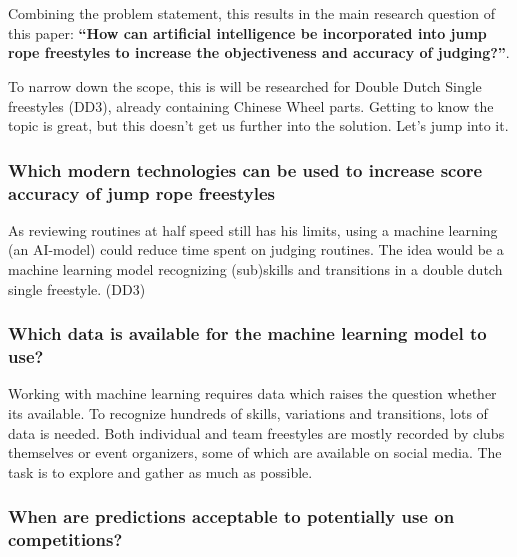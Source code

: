 \section{}%
\label{sec:onderzoeksvraag}

Combining the problem statement, this results in the main research question of this paper: \textbf{``How can artificial intelligence be incorporated into jump rope freestyles to increase the objectiveness and accuracy of judging?''}.

To narrow down the scope, this is will be researched for Double Dutch Single freestyles (DD3), already containing Chinese Wheel parts. Getting to know the topic is great, but this doesn't get us further into the solution. Let's jump into it.

\subsubsection{Which modern technologies can be used to increase score accuracy of jump rope freestyles}
\label{subsubsec:intro-question-integration}

As reviewing routines at half speed still has his limits, using a machine learning (an AI-model) could reduce time spent on judging routines. The idea would be a machine learning model recognizing (sub)skills and transitions in a double dutch single freestyle. (DD3)

\subsubsection{Which data is available for the machine learning model to use?}
\label{subsubsec:intro-question-data}

Working with machine learning requires data which raises the question whether its available. To recognize hundreds of skills, variations and transitions, lots of data is needed. Both individual and team freestyles are mostly recorded by clubs themselves or event organizers, some of which are available on social media. The task is to explore and gather as much as possible.

\subsubsection{When are predictions acceptable to potentially use on competitions?}
\label{subsubsec:intro-question-acceptable-results}

